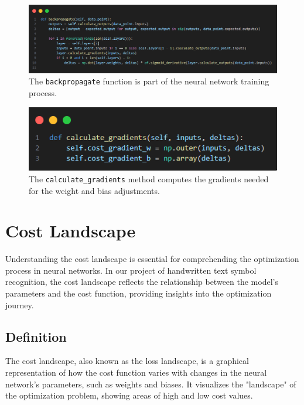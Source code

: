 \documentclass{article}
\begin{document}
\begin{figure}[ht]
    \centering 
    \includegraphics[width=1\textwidth]{images/backpropagate.png}
    \caption{The \texttt{backpropagate} function is part of the neural network training process.}
    \label{fig:backpropagation}
\end{figure}

\begin{figure}[ht]
    \centering 
    \includegraphics[width=1\textwidth]{images/calculate-gradients.png}
    \caption{The \texttt{calculate\_gradients} method computes the gradients needed for the weight and bias adjustments.}
    \label{fig:calculate_gradients}
\end{figure}

\newpage
\section{Cost Landscape}

Understanding the cost landscape is essential for comprehending the optimization process in neural networks. In our project of handwritten text symbol recognition, the cost landscape reflects the relationship between the model's parameters and the cost function, providing insights into the optimization journey.

\subsection{Definition}
The cost landscape, also known as the loss landscape, is a graphical representation of how the cost function varies with changes in the neural network's parameters, such as weights and biases. It visualizes the "landscape" of the optimization problem, showing areas of high and low cost values.
\end{document}
